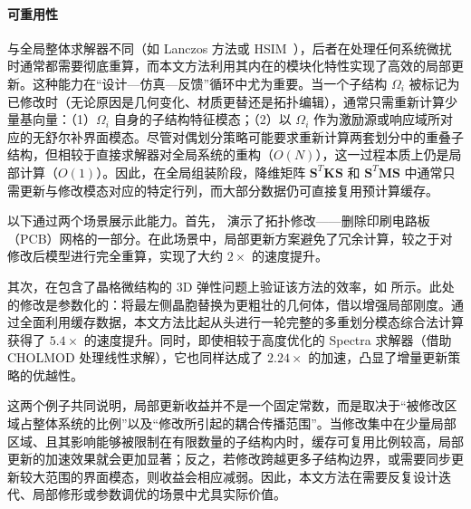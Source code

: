 \paragraph{可重用性}
与全局整体求解器不同（如 Lanczos 方法或 HSIM~\cite{Nasikun2022HSIM}），后者在处理任何系统微扰时通常都需要彻底重算，而本文方法利用其内在的模块化特性实现了高效的局部更新。这种能力在“设计—仿真—反馈”循环中尤为重要。当一个子结构 $\Omega_i$ 被标记为已修改时（无论原因是几何变化、材质更替还是拓扑编辑），通常只需重新计算少量基向量：（1）$\Omega_i$ 自身的子结构特征模态；（2）以 $\Omega_i$ 作为激励源或响应域所对应的无舒尔补界面模态。尽管对偶划分策略可能要求重新计算两套划分中的重叠子结构，但相较于直接求解器对全局系统的重构（$O(N)$），这一过程本质上仍是局部计算（$O(1)$）。因此，在全局组装阶段，降维矩阵 $\mathbf{S}^T \mathbf{K} \mathbf{S}$ 和 $\mathbf{S}^T \mathbf{M} \mathbf{S}$ 中通常只需更新与修改模态对应的特定行列，而大部分数据仍可直接复用预计算缓存。

以下通过两个场景展示此能力。首先， 演示了拓扑修改——删除印刷电路板（PCB）网格的一部分。在此场景中，局部更新方案避免了冗余计算，较之于对修改后模型进行完全重算，实现了大约 $2\times$ 的速度提升。

其次，在包含了晶格微结构的 3D 弹性问题上验证该方法的效率，如  所示。此处的修改是参数化的：将最左侧晶胞替换为更粗壮的几何体，借以增强局部刚度。通过全面利用缓存数据，本文方法比起从头进行一轮完整的多重划分模态综合法计算获得了 $5.4\times$ 的速度提升。同时，即使相较于高度优化的 Spectra 求解器（借助 CHOLMOD 处理线性求解），它也同样达成了 $2.24\times$ 的加速，凸显了增量更新策略的优越性。

这两个例子共同说明，局部更新收益并不是一个固定常数，而是取决于“被修改区域占整体系统的比例”以及“修改所引起的耦合传播范围”。当修改集中在少量局部区域、且其影响能够被限制在有限数量的子结构内时，缓存可复用比例较高，局部更新的加速效果就会更加显著；反之，若修改跨越更多子结构边界，或需要同步更新较大范围的界面模态，则收益会相应减弱。因此，本文方法在需要反复设计迭代、局部修形或参数调优的场景中尤具实际价值。

